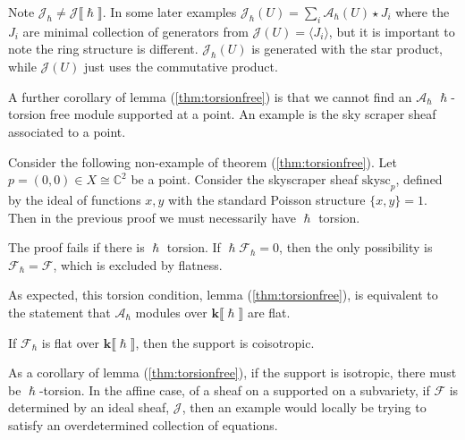     \begin{rem}
    Note \( \mathcal{J}_{\hslash} \neq \mathcal{J}\lBrack \hslash \rBrack\). In some later examples \( \mathcal{J}_{\hslash}(U) =  \sum_i \mathcal{A}_{\hslash}(U) \star  J_i \) where the \(J_i\) are minimal collection of generators from \(\mathcal{J}(U) = \langle J_i\rangle  \), but it is important to note the ring structure is different. \( \mathcal{J}_{\hslash}(U)\) is generated with the star product, while \( \mathcal{J}(U)\) just uses the commutative product.
    \end{rem}
    
    
    
    A further corollary of lemma (\ref{thm:torsionfree}) is that we cannot find an \( \mathcal{A}_\hslash \) \(\hslash \)-torsion free module supported at a point. An example is the sky scraper sheaf associated to a point.

    \begin{ex}Consider the following non-example of theorem (\ref{thm:torsionfree}). Let \( p = (0,0) \in X \cong \mathbb{C}^2 \) be a point. Consider the skyscraper sheaf \( \mathrm{skysc}_p \), defined by  the ideal of functions \( x,y\) with the standard Poisson structure \( \{ x,y \} = 1\). Then in the previous proof we must necessarily have \( \hslash \) torsion.
    \end{ex}

    
    The proof fails if there is \( \hslash\) torsion. If \( \hslash \mathcal{F}_{\hslash} = 0\), then the only possibility is \( \mathcal{F}_{\hslash} = \mathcal{F}\), which is excluded by flatness.
    
    As expected, this torsion condition, lemma (\ref{thm:torsionfree}), is equivalent to the statement that \( \mathcal{A}_{\hslash}\) modules over \( \mathbf{k}\lBrack \hslash \rBrack \) are flat.
    
    \begin{lem} If \( \mathcal{F}_\hslash\) is flat over \( \mathbf{k}\lBrack \hslash \rBrack \), then the support is coisotropic.
    \end{lem}
    
    As a corollary of lemma (\ref{thm:torsionfree}), if the support is isotropic, there must be \(\hslash\)-torsion. In the affine case, of a sheaf on a supported on a subvariety, if \(\mathcal{F}\) is determined by an ideal sheaf, \(\mathcal{J}\), then an example would locally be trying to satisfy an overdetermined collection of equations. 
    
